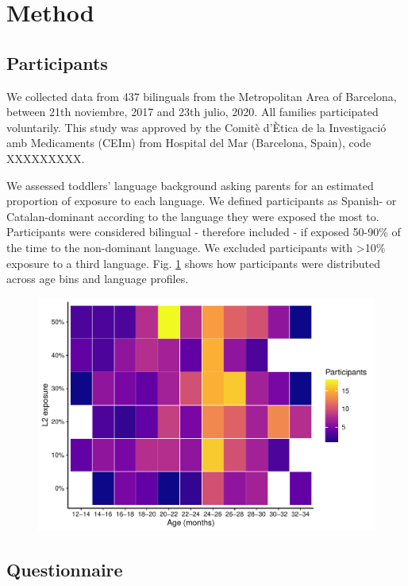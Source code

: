 \documentclass[
  english,
  man,man,floatsintext]{apa6}
\begin{document}
\hypertarget{method}{%
\section{Method}\label{method}}

\hypertarget{participants}{%
\subsection{Participants}\label{participants}}

We collected data from 437 bilinguals from the Metropolitan Area of Barcelona, between 21th noviembre, 2017 and 23th julio, 2020. All families participated voluntarily. This study was approved by the Comitè d'Ètica de la Investigació amb Medicaments (CEIm) from Hospital del Mar (Barcelona, Spain), code XXXXXXXXX.

We assessed toddlers' language background asking parents for an estimated proportion of exposure to each language. We defined participants as Spanish- or Catalan-dominant according to the language they were exposed the most to. Participants were considered bilingual - therefore included - if exposed 50-90\% of the time to the non-dominant language. We excluded participants with \textgreater10\% exposure to a third language. Fig. \ref{fig:lpdist} shows how participants were distributed across age bins and language profiles.

\begin{figure}

{\centering \includegraphics[width=0.8\linewidth]{trajectories_manuscript_files/figure-latex/lpdist-1} 

}

\caption{ }\label{fig:lpdist}
\end{figure}

\hypertarget{questionnaire}{%
\subsection{Questionnaire}\label{questionnaire}}
\end{document}
